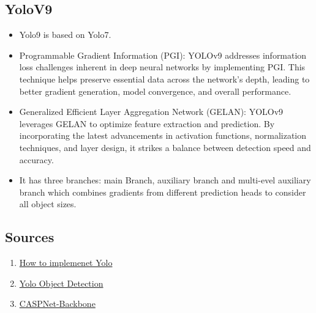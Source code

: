 \subsection{YoloV9}
\begin{itemize}
  \item Yolo9 is based on Yolo7.
  \item Programmable Gradient Information (PGI): YOLOv9 addresses information loss challenges inherent in deep neural networks by implementing PGI. This technique helps preserve essential data across the network’s depth, leading to better gradient generation, model convergence, and overall performance.
  \item Generalized Efficient Layer Aggregation Network (GELAN): YOLOv9 leverages GELAN to optimize feature extraction and prediction. By incorporating the latest advancements in activation functions, normalization techniques, and layer design, it strikes a balance between detection speed and accuracy.
  \item It has three branches: main Branch, auxiliary branch and multi-evel auxiliary branch which combines gradients from different prediction heads to consider all object sizes.
\end{itemize}

\subsection{Sources}
\begin{enumerate}
  \item \href{https://blog.paperspace.com/how-to-implement-a-yolo-object-detector-in-pytorch/}{How to implemenet Yolo}
  \item \href{https://www.superannotate.com/blog/yolo-object-detection}{Yolo Object Detection}
  \item \href{https://arxiv.org/pdf/1911.11929.pdf}{CASPNet-Backbone}
\end{enumerate}